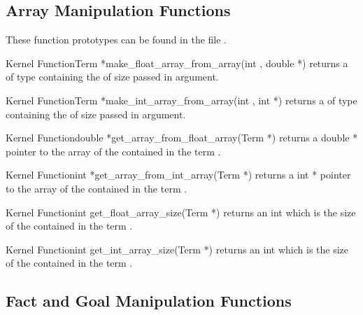 \subsection{Array Manipulation Functions}

These function prototypes can be found in the file .

\begin{typefn}{Kernel Function}{Term *}{make\_float\_array\_from\_array}{(int ,
double *)}
returns a  of type  containing the  of size
 passed in argument.
\end{typefn}

\begin{typefn}{Kernel Function}{Term *}{make\_int\_array\_from\_array}{(int , int
*)}
returns a  of type  containing the  of size
 passed in argument.
\end{typefn}

\begin{typefn}{Kernel Function}{double *}{get\_array\_from\_float\_array}{(Term *)}
returns a double * pointer to the array of the  contained in the
term .
\end{typefn}

\begin{typefn}{Kernel Function}{int *}{get\_array\_from\_int\_array}{(Term *)}
returns a int * pointer to the array of the  contained in the
term .
\end{typefn}

\begin{typefn}{Kernel Function}{int }{get\_float\_array\_size}{(Term *)}
returns an int which is the size of the  contained in the
term .
\end{typefn}

\begin{typefn}{Kernel Function}{int }{get\_int\_array\_size}{(Term *)}
returns an int which is the size of the  contained in the
term .
\end{typefn}

\subsection{Fact and Goal Manipulation Functions}

